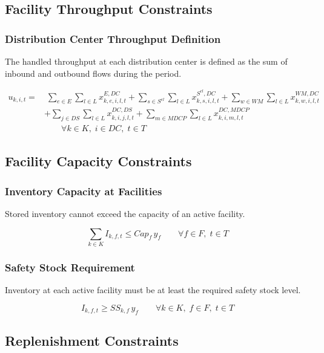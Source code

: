 \documentclass[12pt]{article}
\begin{document}
\subsection{Facility Throughput Constraints}

\subsubsection{Distribution Center Throughput Definition}

The handled throughput at each distribution center is defined as the sum of inbound and outbound flows during the period.

\begin{align*}
u_{k,i,t}
=
& \; \sum_{e \in E}\sum_{l \in L} x^{E,DC}_{k,e,i,l,t}
+ \sum_{s \in S^{cl}}\sum_{l \in L} x^{S^{cl},DC}_{k,s,i,l,t}
+ \sum_{w \in WM}\sum_{l \in L} x^{WM,DC}_{k,w,i,l,t} \\
& + \sum_{j \in DS}\sum_{l \in L} x^{DC,DS}_{k,i,j,l,t}
+ \sum_{m \in MDCP}\sum_{l \in L} x^{DC,MDCP}_{k,i,m,l,t}
\\
& \qquad \forall k \in K,\; i \in DC,\; t \in T
\end{align*}

\subsection{Facility Capacity Constraints}

\subsubsection{Inventory Capacity at Facilities}

Stored inventory cannot exceed the capacity of an active facility.

\[
\sum_{k \in K} I_{k,f,t} \leq Cap_f\, y_f
\qquad
\forall f \in F,\; t \in T
\]

\subsubsection{Safety Stock Requirement}

Inventory at each active facility must be at least the required safety stock level.

\[
I_{k,f,t} \geq SS_{k,f}\, y_f
\qquad
\forall k \in K,\; f \in F,\; t \in T
\]

\subsection{Replenishment Constraints}
\end{document}
